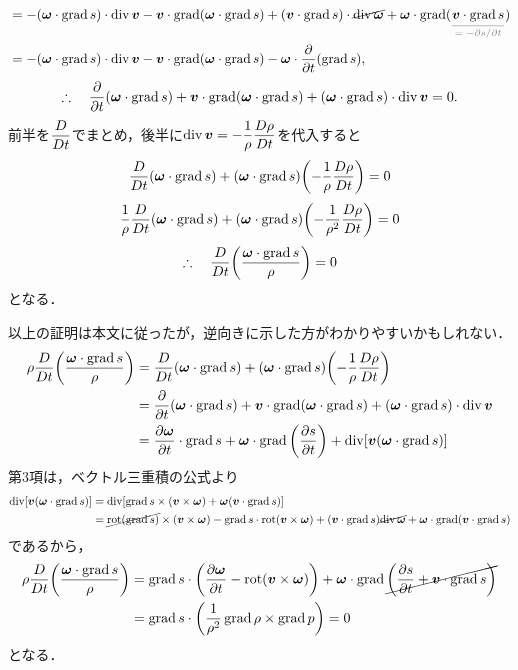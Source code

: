 \begin{kaitou}
\begin{align*}
    &= -(\vec{\omega}\cdot\Grad s) \cdot \Div\v - \v\cdot\Grad(\vec{\omega}\cdot\Grad s)
    + (\v\cdot\Grad s) \cdot \cancel{ \Div{\vec{\omega}} }
    + \vec{\omega} \cdot \Grad( \ucomment{\v\cdot\Grad s}{ $=-\partial s/\partial t$ } ) \\
    &= -(\vec{\omega}\cdot\Grad s) \cdot \Div\v - \v\cdot\Grad(\vec{\omega}\cdot\Grad s)
    - \vec{\omega} \cdot \pdv{t}(\Grad s) ,
\end{align*}
\[
    \therefore\quad \pdv{t}(\vb*{\omega}\cdot\operatorname{grad} s) + \vb*{v}\cdot\operatorname{grad}(\vb*{\omega}\cdot\operatorname{grad} s) + (\vb*{\omega}\cdot\operatorname{grad} s) \cdot \operatorname{div}\vb*{v} = 0 .
\]
前半を$\dfrac{D }{D t}$でまとめ，後半に$\operatorname{div}\vb*{v} = -\dfrac{1}{\rho}\dfrac{D \rho}{D t}$を代入すると
\[
    \DDt{} (\vec{\omega}\cdot\Grad s) + (\vec{\omega}\cdot\Grad s) \pqty{ -\frac{1}{\rho} \dDDt{\rho} } = 0
\]
\[
    \frac{1}{\rho} \DDt{} (\vec{\omega}\cdot\Grad s) + (\vec{\omega}\cdot\Grad s) \pqty{ -\frac{1}{\rho^2} \dDDt{\rho} } = 0
\]
\[
    \yueni \DDt{} \pqty{ \frac{\vec{\omega}\cdot\Grad s}{\rho} } = 0
\]
となる．

以上の証明は本文に従ったが，逆向きに示した方がわかりやすいかもしれない．
\begin{align*}
    \rho \DDt{} \pqty{ \frac{\vec{\omega}\cdot\Grad s}{\rho} }
    &= \DDt{} (\vec{\omega}\cdot\Grad s) + (\vec{\omega}\cdot\Grad s) \pqty{ -\frac{1}{\rho} \dDDt{\rho} } \\
    &= \pdv{t}(\vec{\omega}\cdot\Grad s) + \v\cdot\Grad(\vec{\omega}\cdot\Grad s) + (\vec{\omega}\cdot\Grad s) \cdot \Div\v \\
    &= \pdv{\vec{\omega}}{t}\cdot\Grad s + \vec{\omega}\cdot\Grad\pqty{\pdv{s}{t}} + \Div [\v(\vec{\omega}\cdot\Grad s)]
\end{align*}
第3項は，ベクトル三重積の公式より
\begin{align*}
    \operatorname{div} [\vb*{v}(\vb*{\omega}\cdot\operatorname{grad} s)] &= \operatorname{div}[ \operatorname{grad} s \times (\vb*{v}\times\vb*{\omega}) + \vb*{\omega}(\vb*{v}\cdot\operatorname{grad} s) ] \\
    &= \cancel{\operatorname{rot}(\operatorname{grad} s)} \times (\vb*{v}\times\vb*{\omega}) -\operatorname{grad} s \cdot \operatorname{rot}(\vb*{v}\times\vb*{\omega})
    + (\vb*{v}\cdot\operatorname{grad} s) \cancel{\operatorname{div}\vb*{\omega}} + \vb*{\omega} \cdot \operatorname{grad}(\vb*{v}\cdot\operatorname{grad} s)
\end{align*}
であるから，
\begin{align*}
    \rho \DDt{} \pqty{ \frac{\vec{\omega}\cdot\Grad s}{\rho} }
    &= \Grad s \cdot \pqty{ \pdv{\vec{\omega}}{t} - \Rot(\v\times\vec{\omega}) }
    + \vec{\omega} \cdot \Grad \cancel{ \pqty{\pdv{s}{t} + \v\cdot\Grad s} } \\
    &= \Grad s \cdot \pqty{\frac{1}{\rho^2} \Grad\rho \times \Grad p } = 0
\end{align*}
となる．

\end{kaitou}




\BackToTheToc